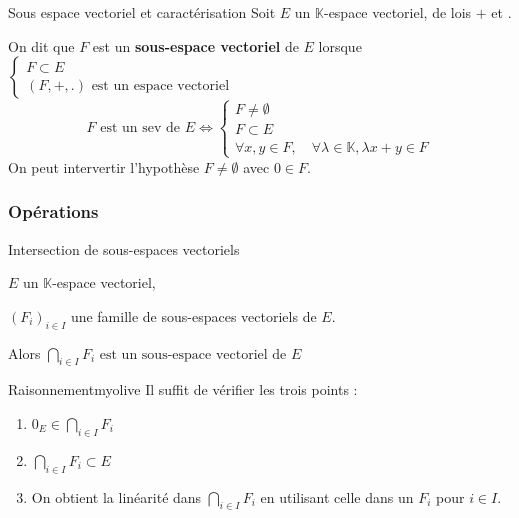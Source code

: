     \begin{defitheo}{Sous espace vectoriel et caractérisation}{}
        Soit $E$ un $\mathbb{K}$-espace vectoriel, de lois $+$ et $.$

        On dit que $F$ est un \textbf{sous-espace vectoriel} de $E$ lorsque $\left\{ \begin{array}{l}
            F \subset E \\
            (F,+,.) \text{ est un espace vectoriel}
        \end{array} \right. $
        \[  F \text{ est un sev de } E \iff \left\{ \begin{array}{l}
            F \neq \emptyset \\
            F \subset E \\
            \forall x,y \in F, \quad \forall \lambda \in \mathbb{K}, \lambda x + y \in F
        \end{array} \right. \]
        On peut intervertir l’hypothèse $F \neq \emptyset$ avec $0 \in F$.
    \end{defitheo}

    \subsubsection{Opérations}

    \begin{prop}{Intersection de sous-espaces vectoriels}{}
        \begin{soient}
            \item $E$ un $\mathbb{K}$-espace vectoriel,
            \item $(F_i)_{i \in I}$ une famille de sous-espaces vectoriels de $E$.
        \end{soient}
        Alors $\bigcap\limits_{i \in I} F_i \text{ est un sous-espace vectoriel de } E $
    \end{prop}

    \begin{demo}{Raisonnement}{myolive}
        Il suffit de vérifier les trois points :
        \begin{enumerate}
            \item $0_E \in \bigcap\limits_{i \in I} F_i$
            \item $\bigcap\limits_{i \in I} F_i \subset E$
            \item On obtient la linéarité dans $\bigcap\limits_{i \in I} F_i$ en utilisant celle dans un $F_i$ pour $i \in I$.
        \end{enumerate}
    \end{demo}


